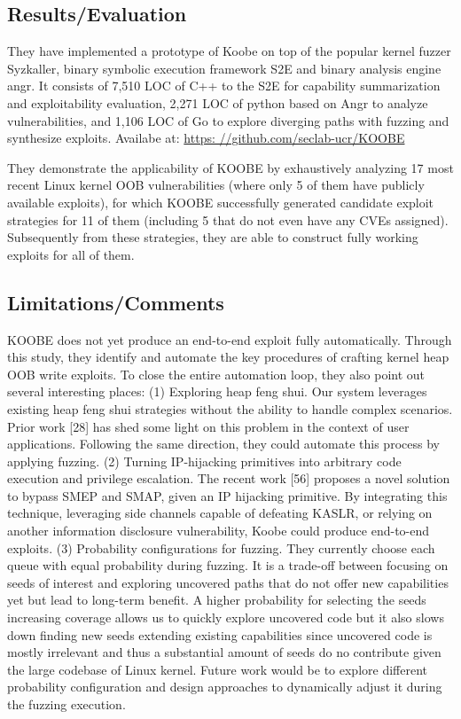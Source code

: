 \subsection{Results/Evaluation}
They have implemented a prototype of Koobe on top of the popular kernel fuzzer Syzkaller, binary symbolic execution framework S2E and binary analysis engine angr.  It consists of 7,510 LOC of C++ to the S2E for capability summarization and exploitability evaluation, 2,271 LOC of python based on Angr to analyze vulnerabilities, and 1,106 LOC of Go to explore diverging paths with fuzzing and synthesize exploits. Availabe at: \url{https: //github.com/seclab-ucr/KOOBE}

They demonstrate the applicability of KOOBE by exhaustively analyzing 17 most recent Linux kernel OOB vulnerabilities (where only 5 of them have publicly available exploits), for which KOOBE successfully generated candidate exploit strategies for 11 of them (including 5 that do not even have any CVEs assigned). Subsequently from these strategies, they are able to construct fully working exploits for all of them.
\subsection{Limitations/Comments}
KOOBE does not yet produce an end-to-end exploit fully automatically. Through this study, they identify and automate the key procedures of crafting kernel heap OOB write exploits. To close the entire automation loop, they also point out several interesting places: (1) Exploring heap feng shui. Our system leverages existing heap feng shui strategies without the ability to handle complex scenarios. Prior work [28] has shed some light on this problem in the context of user applications. Following the same direction, they could automate this process by applying fuzzing. (2) Turning IP-hijacking primitives into arbitrary code execution and privilege escalation. The recent work [56] proposes a novel solution to bypass SMEP and SMAP, given an IP hijacking primitive. By integrating this technique, leveraging side channels capable of defeating KASLR, or relying on another information disclosure vulnerability, Koobe could produce end-to-end exploits. (3) Probability configurations for fuzzing. They currently choose each queue with equal probability during fuzzing. It is a trade-off between focusing on seeds of interest and exploring uncovered paths that do not offer new capabilities yet but lead to long-term benefit. A higher probability for selecting the seeds increasing coverage allows us to quickly explore uncovered code but it also slows down finding new seeds extending existing capabilities since uncovered code is mostly irrelevant and thus a substantial amount of seeds do no contribute given the large codebase of Linux kernel. Future work would be to explore different probability configuration and design approaches to dynamically adjust it during the fuzzing execution.  

